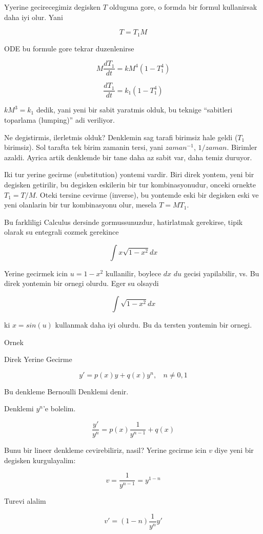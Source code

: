 \documentclass[12pt,fleqn]{article}
\begin{document}
Yyerine gecirecegimiz degisken $T$ olduguna gore, o formda bir formul
kullanirsak daha iyi olur. Yani

\[ T = T_1M \]

ODE bu formule gore tekrar duzenlenirse

\[ M\frac{dT_1}{dt} = kM^4(1-T_1^4)\]

\[ \frac{dT_1}{dt} = k_1(1-T_1^4)  \]

$kM^3 = k_1$ dedik, yani yeni bir sabit yaratmis olduk, bu teknige
``sabitleri toparlama (lumping)'' adi veriliyor.

Ne degistirmis, ilerletmis olduk? Denklemin sag tarafi birimsiz hale
geldi ($T_1$ birimsiz). Sol tarafta tek birim zamanin tersi, yani
$zaman^{-1}$, $1/zaman$. Birimler azaldi. Ayrica artik denklemde bir
tane daha az sabit var, daha temiz duruyor.

Iki tur yerine gecirme (substitution) yontemi vardir. Biri direk
yontem, yeni bir degisken getirilir, bu degisken eskilerin bir tur
kombinasyonudur, onceki ornekte $T_1 = T / M$. Oteki tersine cevirme
(inverse), bu yontemde eski bir degisken eski ve yeni olanlarin bir
tur kombinasyonu olur, mesela $T = MT_1$. 

Bu farkliligi Calculus dersinde gormussunuzdur, hatirlatmak gerekirse,
tipik olarak su entegrali cozmek gerekince

\[ \int x \sqrt{1-x^2} dx \]

Yerine gecirmek icin $u = 1-x^2$ kullanilir, boylece $dx$ $du$ gecisi
yapilabilir, vs. Bu direk yontemin bir ornegi olurdu. Eger su olsaydi

\[ \int \sqrt{1-x^2} dx \]

ki $x = sin(u)$ kullanmak daha iyi olurdu. Bu da tersten yontemin bir ornegi.

Ornek

Direk Yerine Gecirme

\[ y' = p(x)y + q(x)y^n, \ \ \ \  n \neq 0,1 \]

Bu denkleme Bernoulli Denklemi denir. 

Denklemi $y^n$'e bolelim. 

\[ \frac{y'}{y^n} = p(x) \frac{1}{y^{n-1}} + q(x) \]

Bunu bir lineer denkleme cevirebiliriz, nasil? Yerine gecirme icin $v$
diye yeni bir degisken kurgulayalim:

\[ v = \frac{1}{y^{n-1}} = y^{1-n}\]

Turevi alalim

\[ v' = (1-n)\frac{1}{y^n}y' \]
\end{document}
